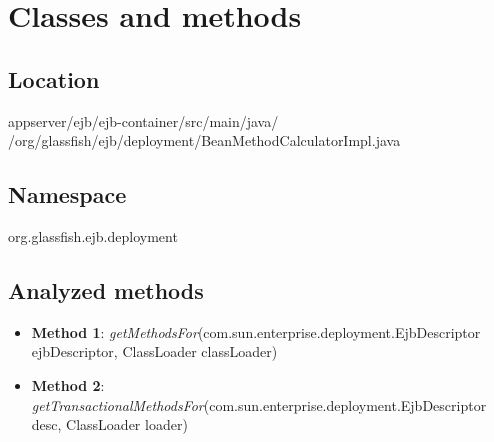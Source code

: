 \section{Classes and methods}
\subsection{Location}
appserver/ejb/ejb-container/src/main/java/\\/org/glassfish/ejb/deployment/BeanMethodCalculatorImpl.java
\subsection{Namespace}
org.glassfish.ejb.deployment

\subsection{Analyzed methods}
\begin{itemize}
	\item \textbf{Method 1}: \textit{getMethodsFor}(com.sun.enterprise.deployment.EjbDescriptor ejbDescriptor, ClassLoader classLoader)
	\item \textbf{Method 2}:  \textit{getTransactionalMethodsFor}(com.sun.enterprise.deployment.EjbDescriptor desc, ClassLoader loader)
\end{itemize}

